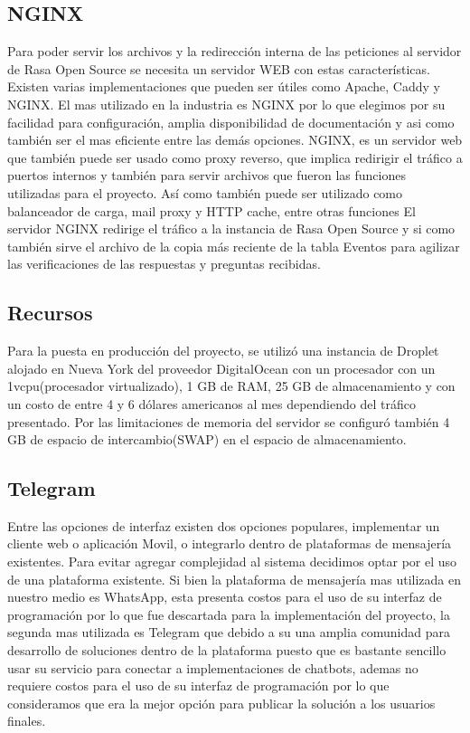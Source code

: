 \subsection{NGINX}
Para poder servir los archivos y la redirección interna de  las peticiones al servidor de Rasa Open
Source se necesita un servidor WEB con estas características. Existen  varias implementaciones que
pueden ser útiles como Apache, Caddy y NGINX. El mas utilizado en la industria es NGINX por lo que
elegimos por su facilidad para configuración, amplia disponibilidad de documentación y asi como
también ser el mas eficiente entre las demás opciones. \cite{web_servers}
NGINX, es un servidor web que también puede ser usado como proxy reverso, que implica redirigir el
tráfico a puertos internos y también para servir archivos que fueron las funciones utilizadas para
el proyecto. Así como también puede ser utilizado como balanceador de carga, mail proxy y HTTP
cache, entre otras funciones \cite{NGINX}
El servidor NGINX redirige el tráfico a la instancia de Rasa Open Source y si como también sirve el
archivo de
la copia más reciente de la tabla Eventos para agilizar las verificaciones de las respuestas y
preguntas recibidas.
\subsection{Recursos}
Para la puesta en producción del proyecto, se utilizó una instancia de Droplet alojado en Nueva
York del proveedor DigitalOcean con un procesador con un 1vcpu(procesador virtualizado), 1 GB de
RAM, 25 GB de almacenamiento y con un costo de entre 4 y 6 dólares americanos al mes dependiendo
del tráfico presentado. Por las limitaciones de memoria del servidor se configuró también 4 GB de
espacio de intercambio(SWAP) en el espacio de almacenamiento.


\subsection{Telegram}
Entre las opciones de interfaz existen dos opciones populares, implementar un cliente web o
aplicación Movil, o integrarlo dentro de plataformas de mensajería existentes. Para evitar agregar
complejidad al sistema decidimos optar por el uso de una plataforma existente. Si bien la plataforma
de mensajería mas utilizada en nuestro medio es WhatsApp, esta presenta
costos para el uso de su interfaz de programación por lo que fue descartada para la implementación del
proyecto, la segunda mas utilizada es Telegram que debido a su una amplia comunidad
para desarrollo de soluciones dentro de la plataforma puesto que es bastante sencillo
usar su servicio para conectar a implementaciones de chatbots, ademas no requiere costos para el
uso de su interfaz de programación por lo que consideramos que era la mejor opción para
publicar la solución a los usuarios finales.
\cite{botfather}

